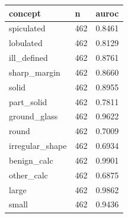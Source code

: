 \begin{tabular}{lll}
\hline
concept & n & auroc \\
\hline
spiculated & 462 & 0.8461 \\
lobulated & 462 & 0.8129 \\
ill\_defined & 462 & 0.8761 \\
sharp\_margin & 462 & 0.8660 \\
solid & 462 & 0.8955 \\
part\_solid & 462 & 0.7811 \\
ground\_glass & 462 & 0.9622 \\
round & 462 & 0.7009 \\
irregular\_shape & 462 & 0.6934 \\
benign\_calc & 462 & 0.9901 \\
other\_calc & 462 & 0.6875 \\
large & 462 & 0.9862 \\
small & 462 & 0.9436 \\
\hline
\end{tabular}

